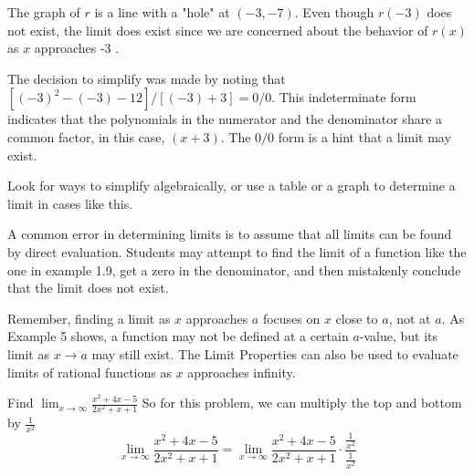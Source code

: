 \documentclass{report}
\begin{document}
\begin{mdframed}
  
\noindent The graph of $r$ is a line with a "hole" at $(-3,-7)$. Even though $r(-3)$ does not exist, the limit does exist since we are concerned about the behavior of $r(x)$ as $x$ approaches -3 . 
\vspace{3mm}

\noindent The decision to simplify was made by noting that $\left[(-3)^2-(-3)-12\right] /[(-3)+3]=0 / 0$. This indeterminate form indicates that the polynomials in the numerator and the denominator share a common factor, in this case, $(x+3)$. The $0 / 0$ form is a hint that a limit may exist. 
\vspace{3mm}

\noindent Look for ways to simplify algebraically, or use a table or a graph to determine a limit in cases like this.
\vspace{5mm}

\noindent A common error in determining limits is to assume that all limits can be found by direct evaluation. Students may attempt to find the limit of a function like the one in example 1.9, get a zero in the denominator, and then mistakenly conclude that the limit does not exist. 
\vspace{3mm}

\noindent Remember, finding a limit as $x$ approaches $a$ focuses on $x$ close to $a$, not at $a$. As Example 5 shows, a function may not be defined at a certain $a$-value, but its limit as $x \rightarrow a$ may still exist.
\bigbreak \noindent
The Limit Properties can also be used to evaluate limits of rational functions as $x$ approaches infinity.
\end{mdframed}
\bigbreak \noindent
\noindent
Find $\displaystyle\lim_{x\to \infty}\frac{x^2+4x-5}{2x^2+x+1}$
\bigbreak \noindent
{}
\bigbreak \noindent
So for this problem, we can multiply the top and bottom by $\frac{1}{x^2}$
$$\displaystyle\lim_{x\to \infty}\frac{x^2+4x-5}{2x^2+x+1} = \displaystyle\lim_{x\to \infty}\frac{x^2+4x-5}{2x^2+x+1}\cdot \frac{\frac{1}{x^2}}{\frac{1}{x^2}}$$
\end{document}
